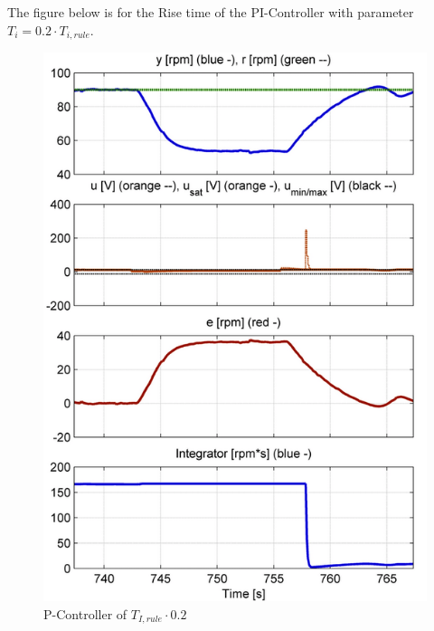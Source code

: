 The figure below is for the Rise time of the PI-Controller with parameter $T_{i}=0.2\cdot{T_{i,rule}}$.
\begin{figure}[H]
\begin{center}
\includegraphics[width=0.6\linewidth]{images/general//PI/PI_RiseTime02}
\end{center}
\caption{P-Controller of $ T_{I,rule}\cdot{0.2}$}
\label{fig:PI_RiseTime02}
\end{figure}

